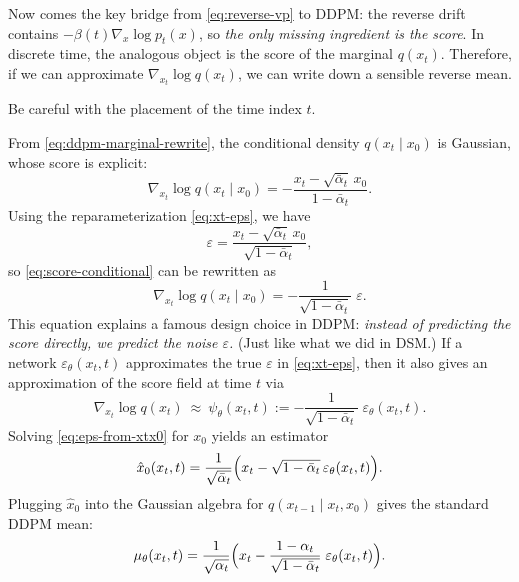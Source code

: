 \documentclass[../main]{subfiles}
\begin{document}
Now comes the key bridge from \eqref{eq:reverse-vp} to DDPM:
the reverse drift contains $-\beta(t)\nabla_x\log p_t(x)$, so \emph{the only missing ingredient is the score}.
In discrete time, the analogous object is the score of the marginal $q(x_t)$.
Therefore, if we can approximate $\nabla_{x_t}\log q(x_t)$, we can write down a sensible reverse mean.
\begin{note}
    Be careful with the placement of the time index $t$.
    \end{note}
From \eqref{eq:ddpm-marginal-rewrite}, the conditional density $q(x_t\mid x_0)$ is Gaussian, whose score is explicit:
\begin{equation}\label{eq:score-conditional}
    \nabla_{x_t}\log q(x_t\mid x_0)
    =
    -\frac{x_t-\sqrt{\bar\alpha_t}\,x_0}{1-\bar\alpha_t}.
\end{equation}
Using the reparameterization \eqref{eq:xt-eps}, we have
\begin{equation}\label{eq:eps-from-xtx0}
    \varepsilon=\frac{x_t-\sqrt{\bar\alpha_t}\,x_0}{\sqrt{1-\bar\alpha_t}},
\end{equation}
so \eqref{eq:score-conditional} can be rewritten as
\begin{equation}\label{eq:score-eps}
    \nabla_{x_t}\log q(x_t\mid x_0)
    =
    -\frac{1}{\sqrt{1-\bar\alpha_t}}\;\varepsilon.
\end{equation}
This equation explains a famous design choice in DDPM:
\emph{instead of predicting the score directly, we predict the noise $\varepsilon$.} (Just like what we did in DSM.)
If a network $\varepsilon_\theta(x_t,t)$ approximates the true $\varepsilon$ in \eqref{eq:xt-eps}, then it also gives
an approximation of the score field at time $t$ via
\begin{equation}\label{eq:score-from-epsnet}
    \nabla_{x_t}\log q(x_t)\ \approx\ \psi_\theta(x_t,t)
    :=-\frac{1}{\sqrt{1-\bar\alpha_t}}\;\varepsilon_\theta(x_t,t).
\end{equation}
Solving \eqref{eq:eps-from-xtx0} for $x_0$ yields an estimator
\begin{equation}\label{eq:x0-hat}
    \hat x_0(x_t,t)=\frac{1}{\sqrt{\bar\alpha_t}}\Bigl(x_t-\sqrt{1-\bar\alpha_t}\,\varepsilon_\theta(x_t,t)\Bigr).
\end{equation}
Plugging $\hat x_0$ into the Gaussian algebra for $q(x_{t-1}\mid x_t,x_0)$ gives the standard DDPM mean:
\begin{equation}\label{eq:ddpm-mean}
    \mu_\theta(x_t,t)
    =
    \frac{1}{\sqrt{\alpha_t}}
    \Bigl(x_t-\frac{1-\alpha_t}{\sqrt{1-\bar\alpha_t}}\;\varepsilon_\theta(x_t,t)\Bigr).
\end{equation}
\end{document}
